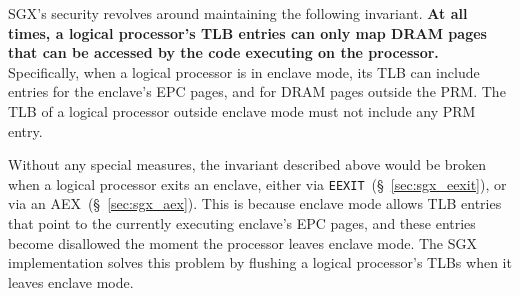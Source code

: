 SGX's security revolves around maintaining the following
invariant. \textbf{At all times, a logical processor's TLB
entries can only map DRAM pages that can be accessed by the code executing on
the processor.} Specifically, when a logical processor is in enclave mode, its
TLB can include entries for the enclave's EPC pages, and for DRAM pages outside
the PRM. The TLB of a logical processor outside enclave mode must not include
any PRM entry.

Without any special measures, the invariant described above would be broken
when a logical processor exits an enclave, either via
\texttt{EEXIT}~(\S~\ref{sec:sgx_eexit}), or via an AEX~(\S~\ref{sec:sgx_aex}).
This is because enclave mode allows TLB entries that point to the currently
executing enclave's EPC pages, and these entries become disallowed the moment
the processor leaves enclave mode. The SGX implementation solves this problem
by flushing a logical processor's TLBs when it leaves enclave mode.
